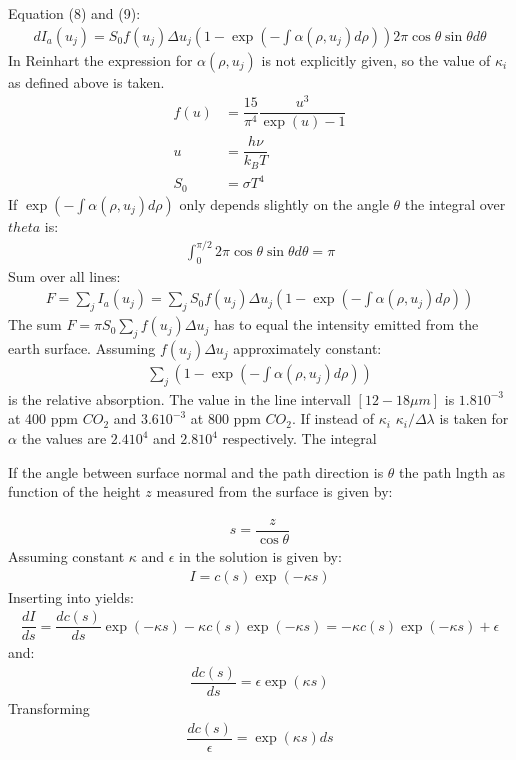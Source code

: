 Equation (8) and (9):
\begin{align}
    dI_a(u_j) = S_0 f(u_j) \Delta u_j \left(1 - \exp\left(-\int \alpha(\rho, u_j) d \rho\right) \right) 2 \pi \cos \theta \sin \theta d \theta
\end{align}
In Reinhart the expression for $\alpha(\rho, u_j)$ is not explicitly given, so the value of $\kappa_i$ as defined above is taken.
\begin{align}
    f(u) &= \dfrac{15}{\pi^4} \dfrac{u^3}{\exp(u) - 1} \\
    u    &= \dfrac{h \nu}{k_B T} \\
    S_0  &= \sigma T^4
\end{align}
If $\exp\left(-\int \alpha(\rho, u_j) d \rho\right)$ only depends slightly on the angle $\theta$ the integral over $theta$ is:
\begin{align}
    \int_{0}^{\pi/2} 2 \pi \cos \theta \sin \theta d \theta = \pi
\end{align}
Sum over all lines:
\begin{align}
    F = \sum_j I_a(u_j) = \sum_j S_0 f(u_j) \Delta u_j \left(1 - \exp\left(-\int \alpha(\rho, u_j) d \rho\right) \right)
\end{align}
The sum $F =  \pi S_0 \sum_j f(u_j) \Delta u_j$ has to equal the intensity emitted from the earth surface.
Assuming $f(u_j) \Delta u_j$ approximately constant:
\begin{align}
    \sum_j \left(1 - \exp\left(-\int \alpha(\rho, u_j) d \rho\right) \right)
\end{align}
is the relative absorption. The value in the line intervall $[12-18 \mu m]$ is $1.8 10^{-3}$ at 400 ppm $CO_2$ and $3.6  10^{-3}$ at 800 ppm $CO_2$.
If instead of $\kappa_i$ $\kappa_i / \Delta \lambda$ is taken for $\alpha$ the values are $2.4 10^4$ and $2.8 10^4$ respectively.
The integral

If the angle between surface normal and the path direction is $\theta$ the path lngth as function of the height $z$ measured from 
the surface is given by:

\begin{align}
	s = \dfrac{z}{\cos\theta}
\end{align}
Assuming constant $\kappa$ and $\epsilon$ in  the solution is given by:
\begin{align}
	I = c(s) \exp( - \kappa s)
\end{align}
Inserting into  yields:
\begin{align}
		\dfrac{d I}{d s} = \dfrac{d c(s)}{ds } \exp( - \kappa s) - \kappa c(s) \exp( - \kappa s) = - \kappa c(s) \exp( - \kappa s) + \epsilon
\end{align}
and:
\begin{align}
	\dfrac{d c(s)}{ds}  = \epsilon \exp(\kappa s)
\end{align}
Transforming
\begin{align}
	\dfrac{d c(s)}{\epsilon}  =  \exp(\kappa s) ds
\end{align}

